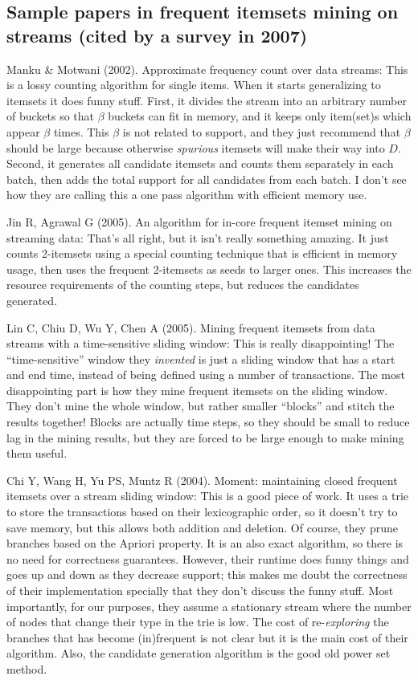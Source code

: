 \documentclass[11pt]{llncs} %
\begin{document}
\subsection{Sample papers in frequent itemsets mining on streams (cited by a survey in 2007)}
Manku \& Motwani (2002). Approximate frequency count over data streams:
This is a lossy counting algorithm for single items. When it starts generalizing to itemsets it does funny stuff. First, it divides the stream into an arbitrary number of buckets so that $\beta$ buckets can fit in memory, and it keeps only item(set)s which appear $\beta$ times. This $\beta$ is not related to support, and they just recommend that $\beta$ should be large because otherwise \emph{spurious} itemsets will make their way into $D$. Second, it generates all candidate itemsets and counts them separately in each batch, then adds the total support for all candidates from each batch. I don't see how they are calling this a one pass algorithm with efficient memory use.


Jin R, Agrawal G (2005). An algorithm for in-core frequent itemset mining on streaming data:
That's all right, but it isn't really something amazing. It just counts 2-itemsets using a special counting technique that is efficient in memory usage, then uses the frequent 2-itemsets as seeds to larger ones. This increases the resource requirements of the counting steps, but reduces the candidates generated.

Lin C, Chiu D, Wu Y, Chen A (2005). Mining frequent itemsets from data streams with a time-sensitive sliding window:
 This is really disappointing! The ``time-sensitive'' window they \emph{invented} is just a sliding window that has a start and end time, instead of being defined using a number of transactions. The most disappointing part is how they mine frequent itemsets on the sliding window. They don't mine the whole window, but rather smaller ``blocks'' and stitch the results together! Blocks are actually time steps, so they should be small to reduce lag in the mining results, but they are forced to be large enough to make mining them useful.

Chi Y, Wang H, Yu PS, Muntz R (2004). Moment: maintaining closed frequent itemsets over a stream sliding window: 
This is a good piece of work. It uses a trie to store the transactions based on their lexicographic order, so it doesn't try to save memory, but this allows both addition and deletion. Of course, they prune branches based on the Apriori property. It is an also exact algorithm, so there is no need for correctness guarantees. However, their runtime does funny things and goes up and down as they decrease support; this makes me doubt the correctness of their implementation specially that they don't discuss the funny stuff. Most importantly, for our purposes, they assume a stationary stream where the number of nodes that change their type in the trie is low. The cost of re-\emph{exploring} the branches that has become (in)frequent is not clear but it is the main cost of their algorithm. Also, the candidate generation algorithm is the good old power set method.
\end{document}
